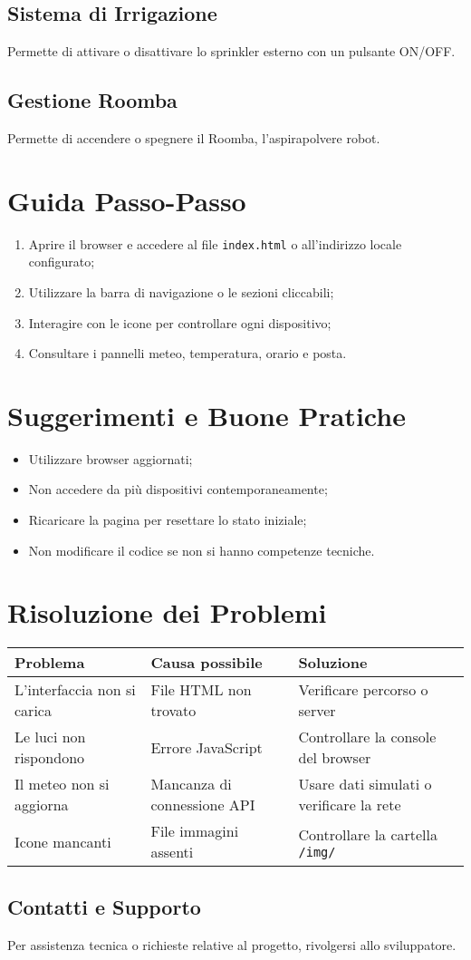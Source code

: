 \documentclass[a4paper,12pt]{article}
\begin{document}
\subsection*{Sistema di Irrigazione}
Permette di attivare o disattivare lo sprinkler esterno con un pulsante ON/OFF.

\subsection*{Gestione Roomba}
Permette di accendere o spegnere il Roomba, l'aspirapolvere robot.

\section{Guida Passo-Passo}

\begin{enumerate}
  \item Aprire il browser e accedere al file \texttt{index.html} o all’indirizzo locale configurato;
  \item Utilizzare la barra di navigazione o le sezioni cliccabili;
  \item Interagire con le icone per controllare ogni dispositivo;
  \item Consultare i pannelli meteo, temperatura, orario e posta.
\end{enumerate}

\section{Suggerimenti e Buone Pratiche}

\begin{itemize}
  \item Utilizzare browser aggiornati;
  \item Non accedere da più dispositivi contemporaneamente;
  \item Ricaricare la pagina per resettare lo stato iniziale;
  \item Non modificare il codice se non si hanno competenze tecniche.
\end{itemize}

\section{Risoluzione dei Problemi}

\begin{tabular}{|p{5cm}|p{5cm}|p{5cm}|}
\hline
\textbf{Problema} & \textbf{Causa possibile} & \textbf{Soluzione} \\
\hline
L’interfaccia non si carica & File HTML non trovato & Verificare percorso o server \\
\hline
Le luci non rispondono & Errore JavaScript & Controllare la console del browser \\
\hline
Il meteo non si aggiorna & Mancanza di connessione API & Usare dati simulati o verificare la rete \\
\hline
Icone mancanti & File immagini assenti & Controllare la cartella \texttt{/img/} \\
\hline
\end{tabular}

\subsection{Contatti e Supporto}

Per assistenza tecnica o richieste relative al progetto, rivolgersi allo sviluppatore.
\end{document}
